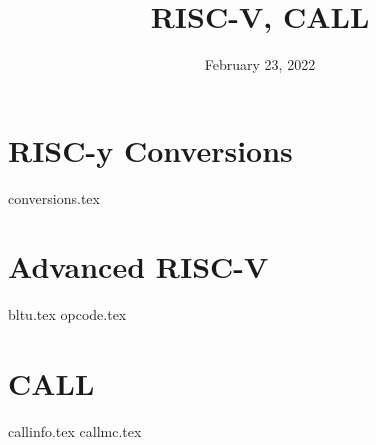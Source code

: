 \documentclass{exam}
\title{RISC-V, CALL}
\date{February 23, 2022}
\begin{document}
\maketitle

\section{RISC-y Conversions}
\begin{questions}
{conversions.tex}
\end{questions}
\newpage

\section{Advanced RISC-V}
\begin{questions}
{bltu.tex}
{opcode.tex}
\end{questions}

\section{CALL}
\begin{questions}
{callinfo.tex}
{callmc.tex}
\end{questions}

\end{document}
